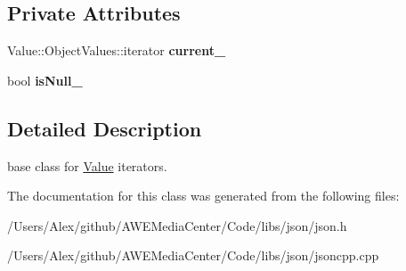 \subsection*{Private Attributes}
\begin{DoxyCompactItemize}
\item 
\hypertarget{class_json_1_1_value_iterator_base_ab3138ce8af8301cca3b041ea55cb922a}{Value\-::\-Object\-Values\-::iterator {\bfseries current\-\_\-}}\label{class_json_1_1_value_iterator_base_ab3138ce8af8301cca3b041ea55cb922a}

\item 
\hypertarget{class_json_1_1_value_iterator_base_a3e08b114a1aed9bde518c527f94a8c59}{bool {\bfseries is\-Null\-\_\-}}\label{class_json_1_1_value_iterator_base_a3e08b114a1aed9bde518c527f94a8c59}

\end{DoxyCompactItemize}


\subsection{Detailed Description}
base class for \hyperlink{class_json_1_1_value}{Value} iterators. 



The documentation for this class was generated from the following files\-:\begin{DoxyCompactItemize}
\item 
/\-Users/\-Alex/github/\-A\-W\-E\-Media\-Center/\-Code/libs/json/json.\-h\item 
/\-Users/\-Alex/github/\-A\-W\-E\-Media\-Center/\-Code/libs/json/jsoncpp.\-cpp\end{DoxyCompactItemize}
